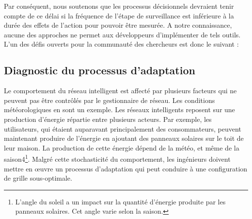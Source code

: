 Par conséquent, nous soutenons que les processus décisionnels devraient tenir compte de ce délai si la fréquence de l'étape de surveillance est inférieure à la durée des effets de l'action pour pouvoir être mesurée. 
A notre connaissance, aucune des approches ne permet aux développeurs d'implémenter de tels outils. 
L'un des défis ouverts pour la communauté des chercheurs est donc le suivant :
\vspace{-2em}

\subsection{Diagnostic du processus d'adaptation}
\label{sec:french:challenges:diagnosis}

%
Le comportement du réseau intelligent est affecté par plusieurs facteurs qui ne peuvent pas être contrôlés par le gestionnaire de réseau. 
Les conditions météorologiques en sont un exemple. Les réseaux intelligents reposent sur une production d'énergie répartie entre plusieurs acteurs. 
Par exemple, les utilisateurs, qui étaient auparavant principalement des consommateurs, peuvent maintenant produire de l'énergie en ajoutant des panneaux solaires sur le toit de leur maison. 
La production de cette énergie dépend de la météo, et même de la saison4\footnote{L'angle du soleil a un impact sur la quantité d'énergie produite par les panneaux solaires. Cet angle varie selon la saison.}. 
Malgré cette stochasticité du comportement, les ingénieurs doivent mettre en œuvre un processus d'adaptation qui peut conduire à une configuration de grille sous-optimale.

